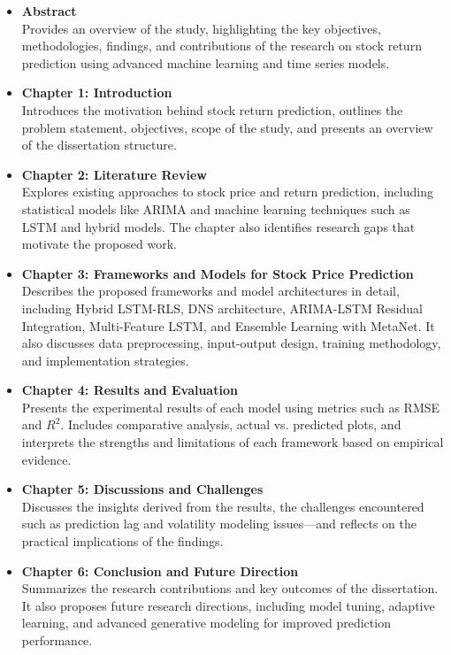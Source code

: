 \begin{itemize}
    \item \textbf{Abstract} \\
    Provides an overview of the study, highlighting the key objectives, methodologies, findings, and contributions of the research on stock return prediction using advanced machine learning and time series models.

    \item \textbf{Chapter 1: Introduction} \\
    Introduces the motivation behind stock return prediction, outlines the problem statement, objectives, scope of the study, and presents an overview of the dissertation structure.

    \item \textbf{Chapter 2: Literature Review} \\
    Explores existing approaches to stock price and return prediction, including statistical models like ARIMA and machine learning techniques such as LSTM and hybrid models. The chapter also identifies research gaps that motivate the proposed work.

    \item \textbf{Chapter 3: Frameworks and Models for Stock Price Prediction} \\
    Describes the proposed frameworks and model architectures in detail, including Hybrid LSTM-RLS, DNS architecture, ARIMA-LSTM Residual Integration, Multi-Feature LSTM, and Ensemble Learning with MetaNet. It also discusses data preprocessing, input-output design, training methodology, and implementation strategies.

    \item \textbf{Chapter 4: Results and Evaluation} \\
    Presents the experimental results of each model using metrics such as RMSE and $R^2$. Includes comparative analysis, actual vs. predicted plots, and interprets the strengths and limitations of each framework based on empirical evidence.

    \item \textbf{Chapter 5: Discussions and Challenges} \\
    Discusses the insights derived from the results, the challenges encountered such as prediction lag and volatility modeling issues—and reflects on the practical implications of the findings.

    \item \textbf{Chapter 6: Conclusion and Future Direction} \\
    Summarizes the research contributions and key outcomes of the dissertation. It also proposes future research directions, including model tuning, adaptive learning, and advanced generative modeling for improved prediction performance.

\end{itemize}